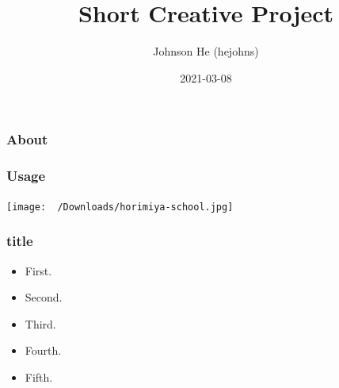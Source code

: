 \documentclass{beamer}
\begin{document}
\title[SCP]{Short Creative Project}
\author{Johnson He (hejohns)}
\date{2021-03-08}
\begin{frame}
    \titlepage
\end{frame}
\begin{frame}
    \frametitle{About}
\end{frame}
\begin{frame}
    \frametitle{Usage}
    \framesubtitle{}
\end{frame}
{
\usebackgroundtemplate
{\texttt{[image: ~/Downloads/horimiya-school.jpg]}}
\begin{frame}
    \frametitle{title}
\end{frame}
\begin{frame}
\begin{itemize}[<+->]
    \item First.
    \item Second.
    \item Third.
    \item Fourth.\hypertarget<4>{label}{}
    \item Fifth.
    \end{itemize}
\end{frame}
}
\end{document}
